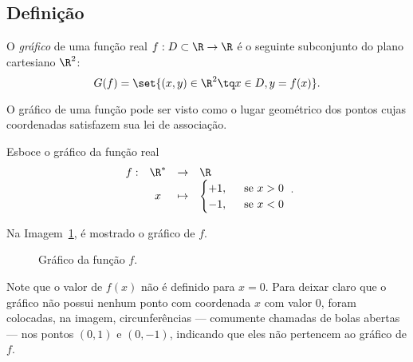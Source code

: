 \subsection{Definição}

\begin{definition}
    O \emph{gráfico} de uma função real $f : D \subset \R \to \R$ é o seguinte subconjunto do plano
cartesiano $\R^2$: $$G(f) = \set{(x,y) \in \R^2 \tq x \in D , y =
f(x)}.$$
\end{definition}

\begin{remark}
    O gráfico de uma função pode ser visto como o lugar geométrico
dos pontos cujas coordenadas satisfazem sua lei de associação.
\end{remark}

\begin{example}
    Esboce o gráfico da função real
    $$\begin{array}{cccl}
    f : & \R^\ast & \to     & \R \\
        &  x & \mapsto & \begin{cases}
                            +1,  &  \ \text{ se } x >0 \\
                            -1, &  \ \text{ se } x <0
                            \end{cases}
    \end{array}.$$
\end{example}

\begin{solution}
    Na Imagem~\ref{img:grafico-funcao-zeroum}, é mostrado o gráfico de $f$.

    \begin{figure}[ht]
    \centering
    \caption{Gráfico da função $f$.}
    \label{img:grafico-funcao-zeroum}
    \end{figure}

    Note que o valor de $f(x)$ não é definido para $x=0$.
    Para deixar claro que o gráfico não possui nenhum ponto com coordenada $x$ com valor $0$, foram colocadas, na imagem, circunferências --- comumente chamadas de bolas abertas --- nos pontos $(0,1)$ e $(0,-1)$, indicando que eles não pertencem ao gráfico de $f$.
\end{solution}